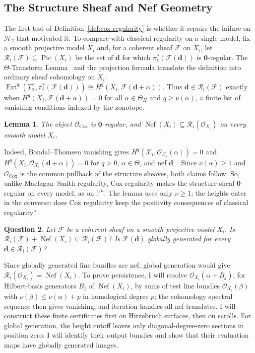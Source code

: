 \documentclass[11pt,reqno]{amsart}
\newtheorem{lemma}{Lemma}[section]
\newtheorem{question}[lemma]{Question}
\theoremstyle{remark}
\newcommand{\Ext}{\operatorname{Ext}}
\newcommand{\Pic}{\operatorname{Pic}}
\newcommand{\Nef}{\operatorname{Nef}}
\newcommand{\Cox}{\operatorname{Cox}}
\newcommand{\dd}{\mathbf{d}}
\newcommand{\zero}{\mathbf{0}}
\newcommand{\PP}{\mathbb{P}}
\newcommand{\cF}{\mathcal{F}}
\newcommand{\cH}{\mathcal{H}}
\newcommand{\cO}{\mathcal{O}}
\newcommand{\cR}{\mathcal{R}}
\newcommand{\cX}{\mathcal{X}}
\begin{document}
\subsection{The Structure Sheaf and Nef Geometry}\label{subsec:cox-regularity}

The first test of Definition~\ref{def:cox-regularity} is whether it repairs the failure on $\cH_2$ that motivated it. To compare with classical regularity on a single model, fix a smooth projective model $X_i$ and, for a coherent sheaf $\cF$ on $X_i$, let $\cR_i(\cF)\subseteq\Pic(X_i)$ be the set of $\dd$ for which $\pi_i^*(\cF(\dd))$ is $\zero$-regular. The $\Theta$-Transform Lemma~\cite[Lemma~1.6]{longLiveKing} and the projection formula translate the definition into ordinary sheaf cohomology on $X_i$: $\Ext^q(T_\alpha^\vee,\pi_i^*(\cF(\dd)))\cong H^q(X_i,\cF(\dd+\alpha))$. Thus $\dd\in\cR_i(\cF)$ exactly when $H^q(X_i,\cF(\dd+\alpha))=0$ for all $\alpha\in\Theta_H$ and $q\ge\nu(\alpha)$, a finite list of vanishing conditions indexed by the zonotope.

\begin{lemma}\label{lem:cox-structure-regular}
The object $\cO_{\Cox}$ is $\zero$-regular, and $\Nef(X_i)\subseteq\cR_i(\cO_{X_i})$ on every smooth model $X_i$.
\end{lemma}

Indeed, Bondal--Thomsen vanishing gives $H^q(\cX_i,\cO_{\cX_i}(\alpha))=0$ and $H^q(X_i,\cO_{X_i}(\dd+\alpha))=0$ for $q>0$, $\alpha\in\Theta$, and nef $\dd$~\cite[Thm.~2.11]{longLiveKing}. Since $\nu(\alpha)\ge1$ and $\cO_{\Cox}$ is the common pullback of the structure sheaves, both claims follow. So, unlike Maclagan--Smith regularity, Cox regularity makes the structure sheaf $\zero$-regular on every model, as on $\PP^n$. The lemma uses only $\nu\ge1$; the heights enter in the converse: does Cox regularity keep the positivity consequences of classical regularity?
 

\begin{question}\label{q:cox-regularity-tests}
Let $\cF$ be a coherent sheaf on a smooth projective model $X_i$. Is $\cR_i(\cF)+\Nef(X_i)\subseteq\cR_i(\cF)$? Is $\cF(\dd)$ globally generated for every $\dd\in\cR_i(\cF)$?
\end{question}

Since globally generated line bundles are nef, global generation would give $\cR_i(\cO_{X_i})=\Nef(X_i)$. To prove persistence, I will resolve $\cO_{X_i}(\alpha+B_j)$, for Hilbert-basis generators $B_j$ of $\Nef(X_i)$, by sums of test line bundles $\cO_{X_i}(\beta)$ with $\nu(\beta)\le\nu(\alpha)+p$ in homological degree $p$; the cohomology spectral sequence then gives vanishing, and iteration handles all nef translates. I will construct these finite certificates first on Hirzebruch surfaces, then on scrolls. For global generation, the height cutoff leaves only diagonal-degree-zero sections in position zero; I will identify their output bundles and show that their evaluation maps have globally generated images.
\end{document}

